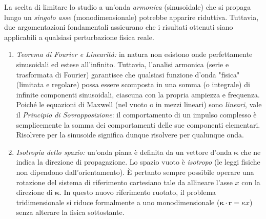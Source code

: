 \documentclass[a4paper,11pt]{report}
\begin{document}
\begin{approfondimento}[
    colback=white,
    colframe=blue!50!black, %
    boxed title style={
        colback=blue!50!black,
        sharp corners,
        frame hidden
    },
    title={Perdita di generalità? L'analisi di Fourier e l'isotropia}
]
La scelta di limitare lo studio a un'onda \textit{armonica} (sinusoidale) che si propaga lungo un \textit{singolo asse} (monodimensionale) potrebbe apparire riduttiva. Tuttavia, due argomentazioni fondamentali assicurano che i risultati ottenuti siano applicabili a qualsiasi perturbazione fisica reale.

\begin{enumerate}
    \item \textit{Teorema di Fourier e Linearità:}
    in natura non esistono onde perfettamente sinusoidali ed estese all'infinito. Tuttavia, l'analisi armonica (serie e trasformata di Fourier) garantisce che qualsiasi funzione d'onda "fisica" (limitata e regolare) possa essere scomposta in una somma (o integrale) di infinite componenti sinusoidali, ciascuna con la propria ampiezza e frequenza.
    Poiché le equazioni di Maxwell (nel vuoto o in mezzi lineari) sono \textit{lineari}, vale il \textit{Principio di Sovrapposizione}: il comportamento di un impulso complesso è semplicemente la somma dei comportamenti delle sue componenti elementari. Risolvere per la sinusoide significa dunque risolvere per qualunque onda.

    \item \textit{Isotropia dello spazio:}
    un'onda piana è definita da un vettore d'onda $\bm{\kappa}$ che ne indica la direzione di propagazione. Lo spazio vuoto è \textit{isotropo} (le leggi fisiche non dipendono dall'orientamento). È pertanto sempre possibile operare una rotazione del sistema di riferimento cartesiano tale da allineare l'asse $x$ con la direzione di $\bm{\kappa}$. In questo nuovo riferimento ruotato, il problema tridimensionale si riduce formalmente a uno monodimensionale ($\bm{\kappa} \cdot \bm{r} = \kappa x$) senza alterare la fisica sottostante.
\end{enumerate}

\end{approfondimento}
\end{document}
